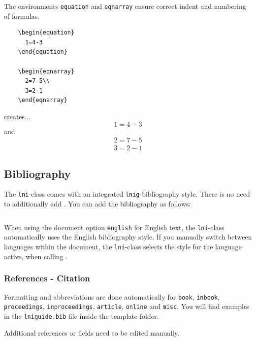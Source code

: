 \documentclass[english]{lni}
\begin{document}
The environments \texttt{equation} and \texttt{eqnarray} ensure correct indent and numbering of formulas.

\begin{verbatim}
	\begin{equation}
	  1=4-3
	\end{equation}

	\begin{eqnarray}
	  2=7-5\\
	  3=2-1
	\end{eqnarray}
\end{verbatim}

creates...
\begin{equation}
	1=4-3
\end{equation}
and
\begin{eqnarray}
	2=7-5\\
	3=2-1
\end{eqnarray}

\subsection{Bibliography}
The \texttt{lni}-class comes with an integrated \texttt{lnig}-bibliography style. There is no need to additionally add \verb||. You can add the bibliography as follows:

\begin{verbatim}

\end{verbatim}

When using the document option \texttt{english} for English text, the \texttt{lni}-class automatically uses the English bibliography style. If you manually switch between languages within the document, the \texttt{lni}-class selects the style for the language active, when calling \verb||.

\subsubsection{References - Citation}

Formatting and abbreviations are done automatically for \texttt{book}, \texttt{inbook}, \texttt{proceedings}, \texttt{inproceedings}, \texttt{article}, \texttt{online} and \texttt{misc}. You will find examples in the \texttt{lniguide.bib} file inside the template folder.

Additional references or fields need to be edited manually.
\end{document}
